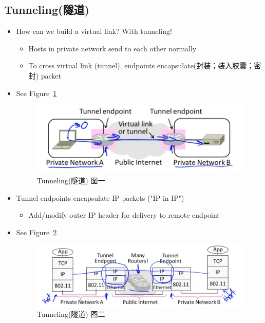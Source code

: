 \documentclass[12pt]{ctexart}   %
\begin{document}
	\subsection{Tunneling(隧道)}
	\begin{itemize}
		\item How can we build a virtual link? With tunneling!
		\begin{itemize}
			\item Hosts in private network send to each other normally
			\item To cross virtual link (tunnel), endpoints encapsulate(封装；装入胶囊；密封) packet
		\end{itemize}
		\item See Figure~\ref{fig:10-8-4}
		  
		\begin{figure}[h!] %
		\centering
		\includegraphics[scale=0.7]{images/10-8-4}
		\caption{Tunneling(隧道) 图一}
		\label{fig:10-8-4}
		\end{figure}

		\item Tunnel endpoints encapsulate IP packets ("IP in IP")
		\begin{itemize}
			\item Add/modify outer IP header for delivery to remote endpoint
		\end{itemize}
		\item See Figure~\ref{fig:10-8-5}
		  
		\begin{figure}[h!] %
		\centering
		\includegraphics[scale=0.7]{images/10-8-5}
		\caption{Tunneling(隧道) 图二}
		\label{fig:10-8-5}
		\end{figure}


\end{itemize}
\end{document}
